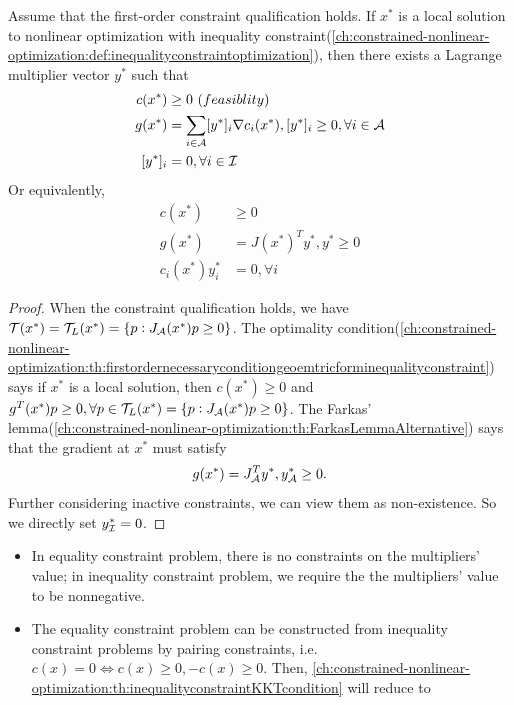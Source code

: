 \begin{refsection}
\begin{theorem}\label{ch:constrained-nonlinear-optimization:th:inequalityconstraintKKTcondition}
Assume that the first-order constraint qualification holds. If $x^*$ is a local solution to nonlinear optimization with inequality constraint(\autoref{ch:constrained-nonlinear-optimization:def:inequalityconstraintoptimization}), then there exists a Lagrange multiplier vector $y^*$ such that
\begin{align*}
c(x^*) &\geq 0 ~(feasiblity)\\
g(x^*) &= \sum_{i\in \mathcal{A}} [y^*]_i \nabla c_i(x^*),  [y^*]_i \geq 0 , \forall i\in \mathcal{A} \\
[y^*]_i &= 0, \forall i \in \mathcal{I}\\
\end{align*}	
Or equivalently,
\begin{align*}
c(x^*) &\geq 0 \\
g(x^*) &= J(x^*)^Ty^*, y^*\geq 0 \\
c_i(x^*)y_i^* &= 0, \forall i
\end{align*}	
\end{theorem}
\begin{proof}
When the constraint qualification holds, we have $\mathcal{T}(x^*) = \mathcal{T}_L(x^*) = \{p: J_{\mathcal{A}}(x^*)p \geq 0 \}$. The optimality condition(\autoref{ch:constrained-nonlinear-optimization:th:firstordernecessaryconditiongeoemtricforminequalityconstraint}) says if $x^*$ is a local solution, then $c(x^*)\geq 0$ and $g^T(x^*)p\geq 0,\forall p\in \mathcal{T}_L(x^*) = \{p: J_{\mathcal{A}}(x^*)p \geq 0 \}$. The Farkas' lemma(\autoref{ch:constrained-nonlinear-optimization:th:FarkasLemmaAlternative}) says that the gradient at $x^*$ must satisfy
$$g(x^*) = J_{\mathcal{A}}^T y^*, y^*_{\mathcal{A}} \geq 0.$$
Further considering inactive constraints, we can view them as non-existence. So we directly set $y^*_{\mathcal{I}} = 0$.
\end{proof}


\begin{remark}\hfill
\begin{itemize}
	\item In equality constraint problem, there is no constraints on the multipliers' value; in inequality constraint problem, we require the the multipliers' value to be nonnegative.
	\item The equality constraint problem can be constructed from inequality constraint problems by pairing constraints, i.e. $c(x) = 0 \Leftrightarrow c(x) \geq 0, -c(x)\geq 0$. Then, \autoref{ch:constrained-nonlinear-optimization:th:inequalityconstraintKKTcondition} will reduce to 
\end{itemize}
\end{remark}



\end{refsection}
